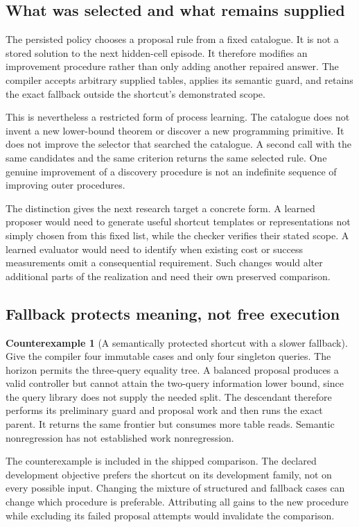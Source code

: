 \documentclass[11pt,letterpaper]{article}
\theoremstyle{plain}
\theoremstyle{definition}
\newtheorem{counterexample}[theorem]{Counterexample}
\begin{document}
\subsection{What was selected and what remains supplied}
The persisted policy chooses a proposal rule from a fixed catalogue. It is not a stored solution to the next hidden-cell episode. It therefore modifies an improvement procedure rather than only adding another repaired answer. The compiler accepts arbitrary supplied tables, applies its semantic guard, and retains the exact fallback outside the shortcut's demonstrated scope.

This is nevertheless a restricted form of process learning. The catalogue does not invent a new lower-bound theorem or discover a new programming primitive. It does not improve the selector that searched the catalogue. A second call with the same candidates and the same criterion returns the same selected rule. One genuine improvement of a discovery procedure is not an indefinite sequence of improving outer procedures.

The distinction gives the next research target a concrete form. A learned proposer would need to generate useful shortcut templates or representations not simply chosen from this fixed list, while the checker verifies their stated scope. A learned evaluator would need to identify when existing cost or success measurements omit a consequential requirement. Such changes would alter additional parts of the realization and need their own preserved comparison.

\subsection{Fallback protects meaning, not free execution}
\begin{counterexample}[A semantically protected shortcut with a slower fallback]\label{ex:slow-fallback}
Give the compiler four immutable cases and only four singleton queries. The horizon permits the three-query equality tree. A balanced proposal produces a valid controller but cannot attain the two-query information lower bound, since the query library does not supply the needed split. The descendant therefore performs its preliminary guard and proposal work and then runs the exact parent. It returns the same frontier but consumes more table reads. Semantic nonregression has not established work nonregression.
\end{counterexample}

The counterexample is included in the shipped comparison. The declared development objective prefers the shortcut on its development family, not on every possible input. Changing the mixture of structured and fallback cases can change which procedure is preferable. Attributing all gains to the new procedure while excluding its failed proposal attempts would invalidate the comparison.
\end{document}
